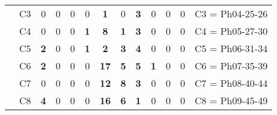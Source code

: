 \begin{table}[H]
{\begin{tabular}{|ccrrrrrrrrrrc|}
\multicolumn{1}{|c|}{}                                      & \multicolumn{1}{c|}{C3} & \multicolumn{1}{c|}{0}  & \multicolumn{1}{c|}{0}  & \multicolumn{1}{c|}{0}  & \multicolumn{1}{c|}{0}  & \multicolumn{1}{c|}{\textbf{1}}  & \multicolumn{1}{c|}{0}  & \multicolumn{1}{c|}{\textbf{3}}  & \multicolumn{1}{c|}{0}  & \multicolumn{1}{c|}{0}  & \multicolumn{1}{c|}{0}  & C3 = Ph04-25-26   \\ \cline{2-13}
\multicolumn{1}{|c|}{}                                      & \multicolumn{1}{c|}{C4} & \multicolumn{1}{c|}{0}  & \multicolumn{1}{c|}{0}  & \multicolumn{1}{c|}{0}  & \multicolumn{1}{c|}{\textbf{1}}  & \multicolumn{1}{c|}{\textbf{8}}  & \multicolumn{1}{c|}{\textbf{1}}  & \multicolumn{1}{c|}{\textbf{3}}  & \multicolumn{1}{c|}{0}  & \multicolumn{1}{c|}{0}  & \multicolumn{1}{c|}{0}  & C4 = Ph05-27-30   \\ \cline{2-13}
\multicolumn{1}{|c|}{}                                      & \multicolumn{1}{c|}{C5} & \multicolumn{1}{c|}{\textbf{2}}  & \multicolumn{1}{c|}{0}  & \multicolumn{1}{c|}{0}  & \multicolumn{1}{c|}{\textbf{1}}  & \multicolumn{1}{c|}{\textbf{2}}  & \multicolumn{1}{c|}{\textbf{3}}  & \multicolumn{1}{c|}{\textbf{4}}  & \multicolumn{1}{c|}{0}  & \multicolumn{1}{c|}{0}  & \multicolumn{1}{c|}{0}  & C5 = Ph06-31-34   \\ \cline{2-13}
\multicolumn{1}{|c|}{}                                      & \multicolumn{1}{c|}{C6} & \multicolumn{1}{c|}{\textbf{2}}  & \multicolumn{1}{c|}{0}  & \multicolumn{1}{c|}{0}  & \multicolumn{1}{c|}{0}  & \multicolumn{1}{c|}{\textbf{17}} & \multicolumn{1}{c|}{\textbf{5}}  & \multicolumn{1}{c|}{\textbf{5}}  & \multicolumn{1}{c|}{\textbf{1}}  & \multicolumn{1}{c|}{0}  & \multicolumn{1}{c|}{0}  & C6 = Ph07-35-39   \\ \cline{2-13}
\multicolumn{1}{|c|}{}                                      & \multicolumn{1}{c|}{C7} & \multicolumn{1}{c|}{0}  & \multicolumn{1}{c|}{0}  & \multicolumn{1}{c|}{0}  & \multicolumn{1}{c|}{0}  & \multicolumn{1}{c|}{\textbf{12}} & \multicolumn{1}{c|}{\textbf{8}}  & \multicolumn{1}{c|}{\textbf{3}}  & \multicolumn{1}{c|}{0}  & \multicolumn{1}{c|}{0}  & \multicolumn{1}{c|}{0}  & C7 = Ph08-40-44   \\ \cline{2-13}
\multicolumn{1}{|c|}{}                                      & \multicolumn{1}{c|}{C8} & \multicolumn{1}{c|}{\textbf{4}}  & \multicolumn{1}{c|}{0}  & \multicolumn{1}{c|}{0}  & \multicolumn{1}{c|}{0}  & \multicolumn{1}{c|}{\textbf{16}} & \multicolumn{1}{c|}{\textbf{6}}  & \multicolumn{1}{c|}{\textbf{1}}  & \multicolumn{1}{c|}{0}  & \multicolumn{1}{c|}{0}  & \multicolumn{1}{c|}{0}  & C8 = Ph09-45-49   \\ \cline{2-13}

\end{tabular}}
\end{table}
